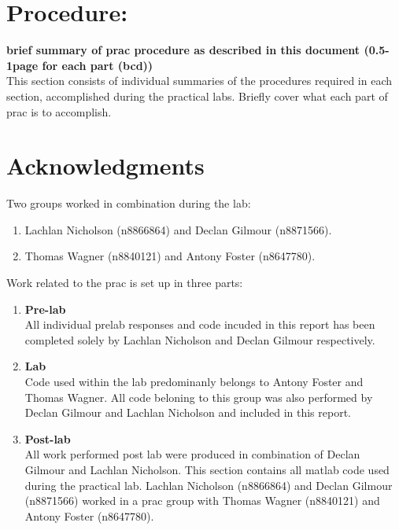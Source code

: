\documentclass[11pt,a4paper]{article}
\begin{document}
\pagebreak
{\hypersetup{linkcolor=black} \tableofcontents}
\pagebreak
{\hypersetup{linkcolor=black} \listoffigures}







\pagebreak
\section{Procedure:}
\textbf{brief summary of prac procedure as described in this document (0.5-1page for each part (bcd))}\\
This section consists of individual summaries of the procedures required in each section, accomplished during the practical labs.
Briefly cover what each part of prac is to accomplish.

\section{Acknowledgments}
Two groups worked in combination during the lab:
\begin{enumerate}
	\item Lachlan Nicholson (n8866864) and Declan Gilmour (n8871566).
	\item Thomas Wagner (n8840121) and Antony Foster (n8647780).
\end{enumerate}
Work related to the prac is set up in three parts:
\begin{enumerate}[label=\alph*)]
	\item \textbf{Pre-lab}\\
	All individual prelab responses and code incuded in this report has been completed solely by Lachlan Nicholson and Declan Gilmour respectively.
	\item \textbf{Lab}\\
	Code used within the lab predominanly belongs to Antony Foster and Thomas Wagner. All code beloning to this group was also performed by Declan Gilmour and Lachlan Nicholson and included in this report.
	\item \textbf{Post-lab}\\
	All work performed post lab were produced in combination of Declan Gilmour and Lachlan Nicholson.
	This section contains all matlab code used during the practical lab. Lachlan Nicholson (n8866864) and Declan Gilmour (n8871566) worked in a prac group with Thomas Wagner (n8840121) and Antony Foster (n8647780).\\
\end{enumerate}
\end{document}
